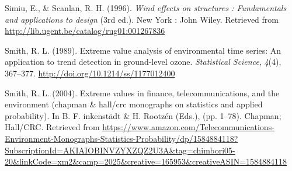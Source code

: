 \documentclass[12pt,twoside]{reedthesis}
\begin{document}
\leavevmode\hypertarget{ref-Simiu1996}{}%
Simiu, E., \& Scanlan, R. H. (1996). \emph{Wind effects on structures : Fundamentals and applications to design} (3rd ed.). New York : John Wiley. Retrieved from \url{http://lib.ugent.be/catalog/rug01:001267836}

\leavevmode\hypertarget{ref-Smith1989}{}%
Smith, R. L. (1989). Extreme value analysis of environmental time series: An application to trend detection in ground-level ozone. \emph{Statistical Science}, \emph{4}(4), 367--377. \url{http://doi.org/10.1214/ss/1177012400}

\leavevmode\hypertarget{ref-Smith2004}{}%
Smith, R. L. (2004). Extreme values in finance, telecommunications, and the environment (chapman \& hall/crc monographs on statistics and applied probability). In B. F. inkenstädt \& H. Rootzén (Eds.), (pp. 1--78). Chapman; Hall/CRC. Retrieved from \url{https://www.amazon.com/Telecommunications-Environment-Monographs-Statistics-Probability/dp/1584884118?SubscriptionId=AKIAIOBINVZYXZQZ2U3A\&tag=chimbori05-20\&linkCode=xm2\&camp=2025\&creative=165953\&creativeASIN=1584884118}


\end{document}
